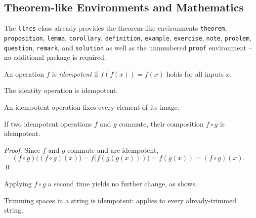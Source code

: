 \subsection{Theorem-like Environments and Mathematics}

The \texttt{llncs} class already provides the theorem-like environments \texttt{theorem}, \texttt{proposition}, \texttt{lemma}, \texttt{corollary}, \texttt{definition}, \texttt{example}, \texttt{exercise}, \texttt{note}, \texttt{problem}, \texttt{question}, \texttt{remark}, and \texttt{solution} as well as the unnumbered \texttt{proof} environment -- no additional package is required.

\begin{ltgexample}
\begin{definition}[Idempotence]
  An operation $f$ is \emph{idempotent} if $f(f(x)) = f(x)$ holds for all inputs $x$.
\end{definition}

\begin{proposition}
  The identity operation is idempotent.
\end{proposition}

\begin{lemma}\label{lem:fixed}
  An idempotent operation fixes every element of its image.
\end{lemma}

\begin{theorem}\label{thm:idempotent-composition}
  If two idempotent operations $f$ and $g$ commute, their composition $f \circ g$ is idempotent.
\end{theorem}

\begin{proof}
  Since $f$ and $g$ commute and are idempotent,
  \begin{equation}
    (f \circ g)\bigl((f \circ g)(x)\bigr) = f\bigl(f(g(g(x)))\bigr) = f(g(x)) = (f \circ g)(x).
    \label{eq:idempotent-composition}
  \end{equation}
  \qed
\end{proof}

\begin{corollary}
  Applying $f \circ g$ a second time yields no further change, as  shows.
\end{corollary}

\begin{example}
  Trimming spaces in a string is idempotent:  applies to every already-trimmed string.
\end{example}
\end{ltgexample}

